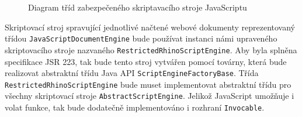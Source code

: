 \begin{figure}[H]
  \begin{center}
    \caption{Diagram tříd zabezpečeného skriptavacího stroje JavaScriptu}
    \label{Figure.JavaScriptEngineJSR223Design}
  \end{center}
\end{figure}

Skriptovací stroj spravující jednotlivé načtené webové dokumenty reprezentovaný třídou \texttt{JavaScriptDocumentEngine} bude používat instanci námi upraveného skriptovacího stroje nazvaného \texttt{RestrictedRhinoScriptEngine}. Aby byla splněna specifikace JSR 223, tak bude tento stroj vytvářen pomocí továrny, která bude realizovat abstraktní třídu Java API \texttt{ScriptEngineFactoryBase}. Třída \texttt{RestrictedRhinoScriptEngine} bude muset implementovat abstraktní třídu pro všechny skriptovací stroje \texttt{AbstractScriptEngine}. Jelikož JavaScript umožňuje i volat funkce, tak bude dodatečně implementováno i rozhraní \texttt{Invocable}. 

